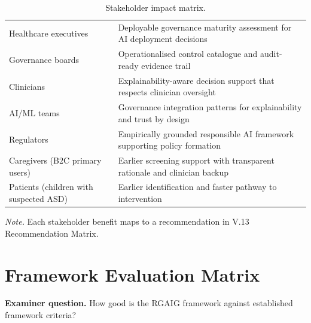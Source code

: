 {\tablestripes\tablefontsize
{}
\begin{xltabular}{\textwidth}{@{} >{\raggedright\arraybackslash}p{3.8cm} L @{}}
\caption[Stakeholder impact matrix]{Stakeholder impact matrix.}\label{tab:dist_stakeholder_matrix} \\
\toprule
{} &  \\
\midrule
\endfirsthead
\endhead
\bottomrule
\endlastfoot
Healthcare executives & Deployable governance maturity assessment for AI deployment decisions \\
\addlinespace
Governance boards & Operationalised control catalogue and audit-ready evidence trail \\
\addlinespace
Clinicians & Explainability-aware decision support that respects clinician oversight \\
\addlinespace
AI/ML teams & Governance integration patterns for explainability and trust by design \\
\addlinespace
Regulators & Empirically grounded responsible AI framework supporting policy formation \\
\addlinespace
Caregivers (B2C primary users) & Earlier screening support with transparent rationale and clinician backup \\
\addlinespace
Patients (children with suspected ASD) & Earlier identification and faster pathway to intervention \\
\end{xltabular}}

\vspace{0.3em}\noindent\textit{Note.} Each stakeholder benefit maps to a recommendation in V.13 Recommendation Matrix.


\section{Framework Evaluation Matrix}
\label{app:distinction_framework_evaluation}

\noindent\textbf{Examiner question.} How good is the RGAIG framework against established framework criteria?

